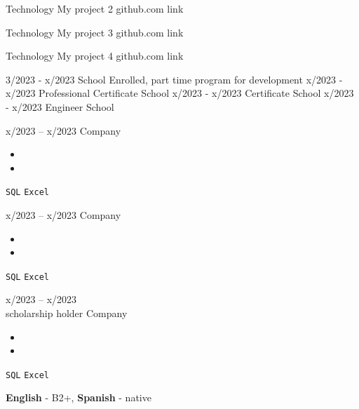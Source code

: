 \documentclass[9pt]{developercv} %
\begin{document}
    \begin{entrylist}


      \entry
        {Technology}
        {My project 2}
        {github.com link}
        {\lipsum[1][1-3]}

      \entry
        {Technology}
        {My project 3}
        {github.com link}
        {\lipsum[1][1-3]}

      \entry
        {Technology}
        {My project 4}
        {github.com link}
        {\lipsum[1][1-3]}
    \end{entrylist}
    
    \vspace{-10 pt}
\begin{entrylist}
    \entry
		{3/2023 - x/2023}
		{\lipsum[1][1] }
		{School}
		{Enrolled, part time program for development}
    \entry
		{x/2023 - x/2023}
		{Professional Certificate}
		{School}
		{\lipsum[1][1]}
	\entry
		{x/2023 - x/2023}
		{Certificate}
		{School}
		{\lipsum[1][2]}
	\entry
		{x/2023 - x/2023}
		{Engineer}
		{School}
		{\lipsum[1][2]}
\end{entrylist}
    
    \vspace{-10 pt}
    \begin{entrylist}
      \entry
            {x/2023 -- x/2023}
        {\lipsum[1][1]}
        {Company}
        {\vspace{-10pt}
            \begin{itemize}[noitemsep,topsep=0pt,parsep=0pt,partopsep=0pt, leftmargin=-1pt]
                \item \lipsum[1][1-2]
                \item \lipsum[1][3-4]
            \end{itemize} 
            \texttt{SQL} \slashsep \texttt{Excel}}
      \entry
        {x/2023 -- x/2023}
        {\lipsum[1][1]}
        {Company}
        {\vspace{-10pt}
            \begin{itemize}[noitemsep,topsep=0pt,parsep=0pt,partopsep=0pt, leftmargin=-1pt]
                \item \lipsum[1][1-2]
                \item \lipsum[1][3-4]
            \end{itemize} 
            \texttt{SQL} \slashsep \texttt{Excel}}
      \entry
        {x/2023 -- x/2023 \\\footnotesize{scholarship holder}}
        {\lipsum[1][1]}
        {Company}
        {\vspace{-10pt}
            \begin{itemize}[noitemsep,topsep=0pt,parsep=0pt,partopsep=0pt, leftmargin=-1pt]
                \item \lipsum[1][1-2]
                \item \lipsum[1][3-4]
            \end{itemize} 
            \texttt{SQL} \slashsep \texttt{Excel}}
    \end{entrylist}
    
    \vspace{-10 pt}
    \vspace{-6pt}
    
    \hspace{26mm} \textbf{English} - B2+, \textbf{ Spanish} - native
    
\end{document}
